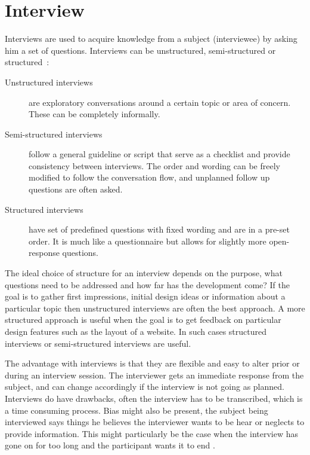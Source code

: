 \section{Interview}
Interviews are used to acquire knowledge from a subject (interviewee) by asking him a set of questions. Interviews can be unstructured, semi-structured or structured~\cite{interactionDesign}:
\begin{description}
  \item[Unstructured interviews] are exploratory conversations around a certain topic or area of concern. These can be completely informally.
  \item[Semi-structured interviews] follow a general guideline or script that serve as a checklist and provide consistency between interviews. The order and wording can be freely modified to follow the conversation flow, and unplanned follow up questions are often asked.
  \item[Structured interviews] have set of predefined questions with fixed wording and are in a pre-set order. It is much like a questionnaire but allows for slightly more open-response questions.
\end{description}

The ideal choice of structure for an interview depends on the purpose, what questions need to be addressed and how far has the development come? If the goal is to gather first impressions, initial design ideas or information about a particular topic then unstructured interviews are often the best approach. A more structured approach is useful when the goal is to get feedback on particular design features such as the layout of a website. In such cases structured interviews or semi-structured interviews are useful.

The advantage with interviews is that they are flexible and easy to alter prior or during an interview session. The interviewer gets an immediate response from the subject, and can change accordingly if the interview is not going as planned. Interviews do have drawbacks, often the interview has to be transcribed, which is a time consuming process. Bias might also be present, the subject being interviewed says things he believes the interviewer wants to be hear or neglects to provide information. This might particularly be the case when the interview has gone on for too long and the participant wants it to end \cite{realWorldResearch}.

